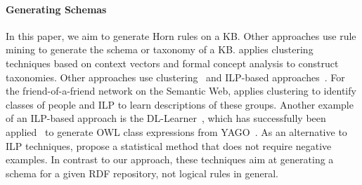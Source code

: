 \paragraph{Generating Schemas} In this paper, we aim to generate Horn rules on a KB. Other approaches use rule mining to generate the schema or taxonomy of a KB.
\cite{CimHotSta04} applies clustering techniques based on context vectors and formal concept analysis to construct taxonomies. 
Other approaches use clustering~\cite{MaeZac02} and ILP-based approaches~\cite{DamFanEsp10}. For the friend-of-a-friend network on the Semantic Web, 
\cite{GriEdwPre04} applies clustering to identify classes of people and ILP to learn descriptions of these groups. 
Another example of an ILP-based approach is the DL-Learner~\cite{Leh09}, which has successfully been applied~\cite{HelLehAue09} to generate OWL class expressions from YAGO~\cite{SucKasWei07}. %
As an alternative to ILP techniques, \cite{VoeNie11} propose a statistical method that does not require negative examples. 
In contrast to our approach, these techniques aim at generating a schema for a given RDF repository, not logical rules in general.

